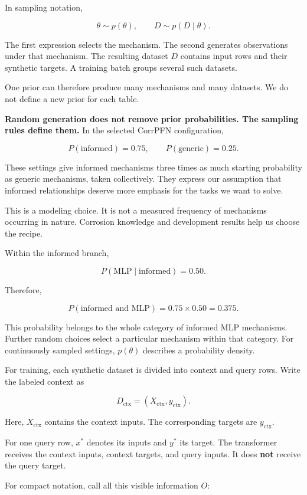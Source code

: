\documentclass[11pt]{article}
\begin{document}
In sampling notation,

\[
\theta\sim p(\theta),
\qquad
D\sim p(D\mid\theta).
\]

The first expression selects the mechanism. The second generates observations under that
mechanism. The resulting dataset \(D\) contains input rows and their synthetic targets. A
training batch groups several such datasets.

One prior can therefore produce many mechanisms and many datasets. We do not define a new
prior for each table.

\textbf{Random generation does not remove prior probabilities. The sampling rules define
them.} In the selected CorrPFN configuration,

\[
P(\text{informed})=0.75,
\qquad
P(\text{generic})=0.25.
\]

These settings give informed mechanisms three times as much starting probability as
generic mechanisms, taken collectively. They express our assumption that informed
relationships deserve more emphasis for the tasks we want to solve.

This is a modeling choice. It is not a measured frequency of mechanisms occurring in
nature. Corrosion knowledge and development results help us choose the recipe.

Within the informed branch,

\[
P(\text{MLP}\mid\text{informed})=0.50.
\]

Therefore,

\[
P(\text{informed and MLP})
=
0.75\times0.50
=
0.375.
\]

This probability belongs to the whole category of informed MLP mechanisms. Further random
choices select a particular mechanism within that category. For continuously sampled
settings, \(p(\theta)\) describes a probability density.

For training, each synthetic dataset is divided into context and query rows. Write the
labeled context as

\[
D_{\mathrm{ctx}}
=
(X_{\mathrm{ctx}},y_{\mathrm{ctx}}).
\]

Here, \(X_{\mathrm{ctx}}\) contains the context inputs. The corresponding targets are
\(y_{\mathrm{ctx}}\).

For one query row, \(x^\ast\) denotes its inputs and \(y^\ast\) its target. The
transformer receives the context inputs, context targets, and query inputs. It does
\textbf{not} receive the query target.

For compact notation, call all this visible information \(O\):
\end{document}
